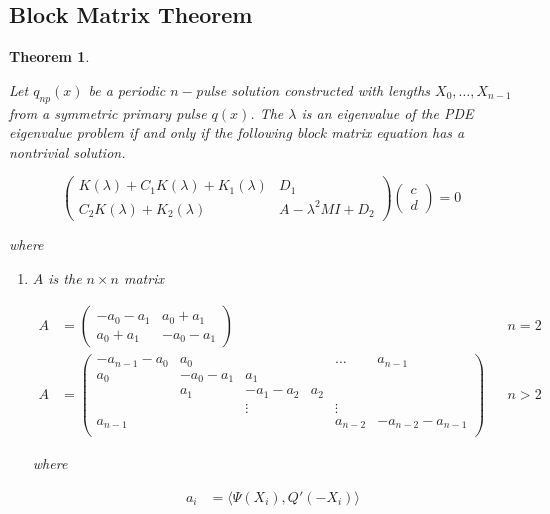 \documentclass[12pt]{article}
\newtheorem{theorem}{Theorem}
\begin{document}
\subsection{Block Matrix Theorem}
\begin{theorem}\label{blockmatrixform}

Let $q_{np}(x)$ be a periodic $n-$pulse solution constructed with lengths $X_0, \dots, X_{n-1}$ from a symmetric primary pulse $q(x)$. The $\lambda$ is an eigenvalue of the PDE eigenvalue problem if and only if the following block matrix equation has a nontrivial solution.

\begin{equation}\label{blockeq}
\begin{pmatrix}
K(\lambda) + C_1 K(\lambda) + K_1(\lambda) & D_1 \\
C_2 K(\lambda) + K_2(\lambda) & A - \lambda^2 MI + D_2
\end{pmatrix}
\begin{pmatrix}c \\ d \end{pmatrix} 
= 0
\end{equation}

where 

\begin{enumerate}

\item $A$ is the $n \times n$ matrix

\begin{align}\label{defA}
A &= \begin{pmatrix}
-a_0 -a_1 & a_0 + a_1 \\
a_0 + a_1 & -a_0 - a_1
\end{pmatrix} && n = 2 \\
A &= \begin{pmatrix}
-a_{n-1} - a_0 & a_0 & & & \dots & a_{n-1}\\
a_0 & -a_0 - a_1 &  a_1 \\
& a_1 & -a_1 - a_2 &  a_2 \\
& & \vdots & & \vdots \\
a_{n-1} & & & & a_{n-2} & -a_{n-2} - a_{n-1} \\
\end{pmatrix} && n > 2 \nonumber
\end{align}

where

\begin{align*}
a_i &= \langle \Psi(X_i), Q'(-X_i) \rangle \\
\end{align*}


\end{enumerate}
\end{theorem}
\end{document}
